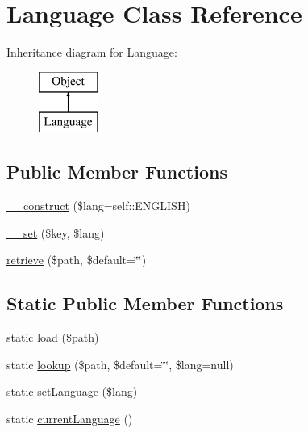 \hypertarget{class_language}{
\section{Language Class Reference}
\label{class_language}
}
Inheritance diagram for Language:\begin{figure}[H]
\begin{center}
\leavevmode
\includegraphics[height=2.000000cm]{class_language}
\end{center}
\end{figure}
\subsection*{Public Member Functions}
\begin{DoxyCompactItemize}
\item 
\hyperlink{class_language_af17309d915b39fc86c6a0f5876d1e20b}{\_\-\_\-construct} (\$lang=self::ENGLISH)
\item 
\hyperlink{class_language_a3b2a9ac447bf0c26d962d219e7a0d3f5}{\_\-\_\-set} (\$key, \$lang)
\item 
\hyperlink{class_language_ae7091034f8610f7e50e29c70f06b70c1}{retrieve} (\$path, \$default=\char`\"{}\char`\"{})
\end{DoxyCompactItemize}
\subsection*{Static Public Member Functions}
\begin{DoxyCompactItemize}
\item 
static \hyperlink{class_language_ad201e53a19768db4164a0e617ade296a}{load} (\$path)
\item 
static \hyperlink{class_language_a317563c27ce7fe4e6161b83abb72d60f}{lookup} (\$path, \$default=\char`\"{}\char`\"{}, \$lang=null)
\item 
static \hyperlink{class_language_a7450e0f49af9cc392772169ffae80a87}{setLanguage} (\$lang)
\item 
static \hyperlink{class_language_a356322982675b807f6cfe041feae588d}{currentLanguage} ()
\end{DoxyCompactItemize}

